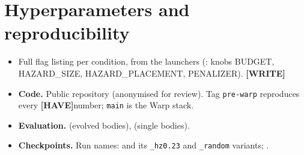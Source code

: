 \documentclass[sigconf,review]{acmart}
\newcommand{\statustag}[2]{\textcolor{#1}{\textsf{\scriptsize\bfseries[#2]}}}
\newcommand{\HAVE}{\statustag{teal!70!black}{HAVE}\hspace{0.3em}}
\newcommand{\WRITE}{\statustag{blue!70!black}{WRITE}\hspace{0.3em}}
\begin{document}
\section{Hyperparameters and reproducibility}
\label{app:repro}
\begin{itemize}
\item Full flag listing per condition, from the launchers (: knobs BUDGET, HAZARD\_SIZE, HAZARD\_PLACEMENT, PENALIZER). \WRITE
\item \textbf{Code.} Public repository (anonymised for review). Tag \texttt{pre-warp} reproduces every \HAVE number; \texttt{main} is the Warp stack.
\item \textbf{Evaluation.}  (evolved bodies),  (single bodies).
\item \textbf{Checkpoints.} Run names:  and its \texttt{\_hz0.23} and \texttt{\_random} variants; .
\end{itemize}
\end{document}
